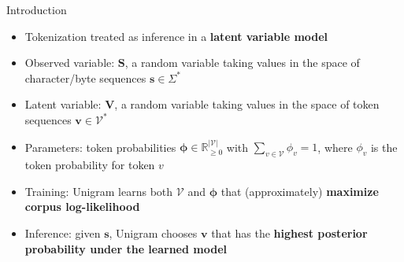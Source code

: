 \documentclass[11pt,compress,t,notes=noshow, xcolor=table]{beamer}
\newcommand{\vocab}{\mathcal{V}}
\newcommand{\probs}{\boldsymbol{\phi}}
\begin{document}
\begin{frame}{Introduction}

\vfill


\begin{itemize}
\item Tokenization treated as inference in a \textbf{latent variable model}
\item Observed variable: $\mathbf{S}$, a random variable taking values in the space of character/byte sequences $\mathbf{s} \in \Sigma^*$
\item Latent variable: $\mathbf{V}$, a random variable taking values in the space of token sequences  $\mathbf{v} \in\vocab^*$
\item Parameters: token probabilities $\probs \in \mathbb{R}^{|\vocab|}_{\geq0}$ with $\sum_{v \in \vocab} \phi_v = 1$, where $\phi_v$ is the token probability for token $v$
\item Training: Unigram learns both $\vocab$ and $\probs$ that (approximately) \textbf{maximize corpus log-likelihood}
\item Inference: given $\mathbf{s}$, Unigram chooses $\mathbf{v}$ that has the \textbf{highest posterior probability under the learned model}
\end{itemize}

\vfill


\end{frame}
\end{document}
